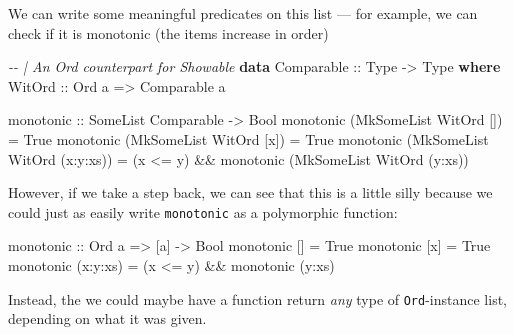 \documentclass[]{article}
\newenvironment{Shaded}{}{}
\newcommand{\CommentTok}[1]{\textcolor[rgb]{0.38,0.63,0.69}{\textit{#1}}}
\newcommand{\DataTypeTok}[1]{\textcolor[rgb]{0.56,0.13,0.00}{#1}}
\newcommand{\KeywordTok}[1]{\textcolor[rgb]{0.00,0.44,0.13}{\textbf{#1}}}
\newcommand{\NormalTok}[1]{#1}
\newcommand{\OperatorTok}[1]{\textcolor[rgb]{0.40,0.40,0.40}{#1}}
\newcommand{\OtherTok}[1]{\textcolor[rgb]{0.00,0.44,0.13}{#1}}
\begin{document}
We can write some meaningful predicates on this list --- for example, we can
check if it is monotonic (the items increase in order)

\begin{Shaded}
\begin{Highlighting}[]
\CommentTok{{-}{-} | An Ord counterpart for Showable}
\KeywordTok{data} \DataTypeTok{Comparable}\OtherTok{ ::} \DataTypeTok{Type} \OtherTok{{-}>} \DataTypeTok{Type} \KeywordTok{where}
    \DataTypeTok{WitOrd}\OtherTok{ ::} \DataTypeTok{Ord}\NormalTok{ a }\OtherTok{=>} \DataTypeTok{Comparable}\NormalTok{ a}

\OtherTok{monotonic ::} \DataTypeTok{SomeList} \DataTypeTok{Comparable} \OtherTok{{-}>} \DataTypeTok{Bool}
\NormalTok{monotonic (}\DataTypeTok{MkSomeList} \DataTypeTok{WitOrd}\NormalTok{ [])       }\OtherTok{=} \DataTypeTok{True}
\NormalTok{monotonic (}\DataTypeTok{MkSomeList} \DataTypeTok{WitOrd}\NormalTok{ [x])      }\OtherTok{=} \DataTypeTok{True}
\NormalTok{monotonic (}\DataTypeTok{MkSomeList} \DataTypeTok{WitOrd}\NormalTok{ (x}\OperatorTok{:}\NormalTok{y}\OperatorTok{:}\NormalTok{xs)) }\OtherTok{=}
\NormalTok{    (x }\OperatorTok{<=}\NormalTok{ y) }\OperatorTok{\&\&}\NormalTok{ monotonic (}\DataTypeTok{MkSomeList} \DataTypeTok{WitOrd}\NormalTok{ (y}\OperatorTok{:}\NormalTok{xs))}
\end{Highlighting}
\end{Shaded}

However, if we take a step back, we can see that this is a little silly because
we could just as easily write \texttt{monotonic} as a polymorphic function:

\begin{Shaded}
\begin{Highlighting}[]
\OtherTok{monotonic\textquotesingle{} ::} \DataTypeTok{Ord}\NormalTok{ a }\OtherTok{=>}\NormalTok{ [a] }\OtherTok{{-}>} \DataTypeTok{Bool}
\NormalTok{monotonic\textquotesingle{} []       }\OtherTok{=} \DataTypeTok{True}
\NormalTok{monotonic\textquotesingle{} [x]      }\OtherTok{=} \DataTypeTok{True}
\NormalTok{monotonic\textquotesingle{} (x}\OperatorTok{:}\NormalTok{y}\OperatorTok{:}\NormalTok{xs) }\OtherTok{=}\NormalTok{ (x }\OperatorTok{<=}\NormalTok{ y) }\OperatorTok{\&\&}\NormalTok{ monotonic\textquotesingle{} (y}\OperatorTok{:}\NormalTok{xs)}
\end{Highlighting}
\end{Shaded}

Instead, the we could maybe have a function return \emph{any} type of
\texttt{Ord}-instance list, depending on what it was given.
\end{document}
